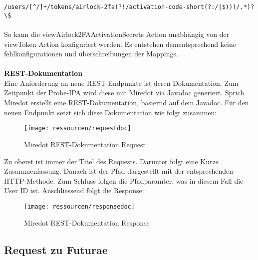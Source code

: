\noindent \verb @/users/[^/]+/tokens/airlock-2fa(?!/activation-code-short(?:/|$))(/.*)?\$ @\\\\
So kann die viewAirlock2FAActivationSecrets Action unabhängig von der viewToken Action konfiguriert werden. Es entstehen dementsprechend keine fehlkonfigurationen und überschreibungen der Mappings.\\
\\
\textbf{REST-Dokumentation}\\
Eine Anforderung an neue REST-Endpunkte ist deren Dokumentation. Zum Zeitpunkt der Probe-IPA wird diese mit Miredot via Javadoc generiert. Sprich Miredot erstellt eine REST-Dokumentation, basiernd auf dem Javadoc. Für den neuen Endpunkt setzt sich diese Dokumentation wie folgt zusammen:
\begin{figure}[H]
	\begin{center}
		\texttt{[image: ressourcen/requestdoc]}
		\caption[REST-Dokumentation Request]{Miredot REST-Dokumentation Request}\label{fig:requestdoc}
	\end{center}
\end{figure}
\noindent Zu oberst ist immer der Titel des Requests. Darunter folgt eine Kurze Zusammenfassung. Danach ist der Pfad dargestellt mit der entsprechenden HTTP-Methode.
Zum Schluss folgen die Pfadparamter, was in diesem Fall die User ID ist.
Anschliessend folgt die Response:

\begin{figure}[H]
	\begin{center}
		\texttt{[image: ressourcen/responsedoc]}
		\caption[REST-Dokumentation Response]{Miredot REST-Dokumentation Response}\label{fig:responsedoc}
	\end{center}
\end{figure}

\subsection{Request zu Futurae}



















